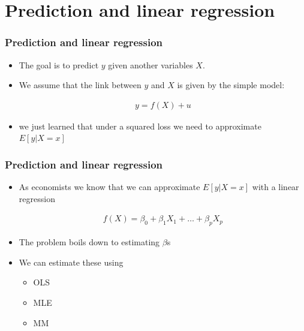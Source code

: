 \documentclass[
  shownotes,
  xcolor={svgnames},
  hyperref={colorlinks,citecolor=DarkBlue,linkcolor=andesred,urlcolor=DarkBlue}
  , aspectratio=169]{beamer}
\begin{document}
\section{Prediction and linear regression}
\begin{frame}
\frametitle{Prediction and linear regression}




\begin{itemize}
  \item The goal is to predict $y$ given another variables $X$. 
  \medskip
  \item We  assume that the link between $y$ and $X$ is given by the simple model:


\begin{align}
  y = f(X) + u
\end{align}

\item we just learned that under a squared loss we need to approximate $E[y|X=x]$
\end{itemize}

\end{frame}
\begin{frame}
\frametitle{Prediction and linear regression}

\begin{itemize}
\item As economists we know that we can approximate $E[y|X=x]$ with a linear regression

\begin{align}
  f(X) = \beta_0 + \beta_1 X_1 + \dots + \beta_p X_p 
\end{align}

\item The problem boils down to estimating $\beta$s
\medskip
\item We can estimate these using
  \begin{itemize}
    \footnotesize
    \item  OLS
    \medskip
    \item MLE
    \medskip
    \item MM
  \end{itemize}  
\end{itemize}

\end{frame}
\end{document}
